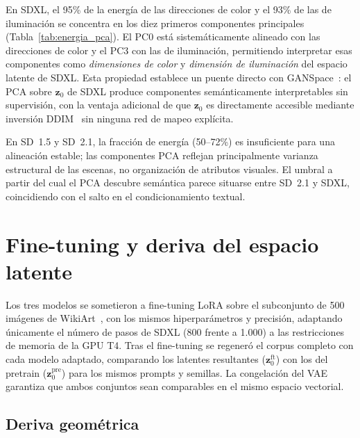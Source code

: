 \documentclass[12pt, a4paper, twoside]{book}
\newcommand{\z}{\mathbf{z}}
\begin{document}
En SDXL, el 95\% de la energía de las direcciones de color y el 93\% de las de iluminación
se concentra en los diez primeros componentes principales (Tabla~\ref{tab:energia_pca}).
El PC0 está sistemáticamente alineado con las direcciones de color y el PC3 con las de
iluminación, permitiendo interpretar esas componentes como \textit{dimensiones de color} y
\textit{dimensión de iluminación} del espacio latente de SDXL. Esta propiedad establece
un puente directo con GANSpace~\citep{harkonen2020ganspace}: el PCA sobre $\z_0$ de SDXL
produce componentes semánticamente interpretables sin supervisión, con la ventaja adicional
de que $\z_0$ es directamente accesible mediante inversión DDIM~\citep{song2021ddim} sin
ninguna red de mapeo explícita.

En SD~1.5 y SD~2.1, la fracción de energía (50--72\%) es insuficiente para una alineación
estable; las componentes PCA reflejan principalmente varianza estructural de las escenas,
no organización de atributos visuales. El umbral a partir del cual el PCA descubre semántica
parece situarse entre SD~2.1 y SDXL, coincidiendo con el salto en el condicionamiento textual.

\section{Fine-tuning y deriva del espacio latente}
\label{sec:res:finetune}

Los tres modelos se sometieron a fine-tuning LoRA sobre el subconjunto de 500 imágenes de
WikiArt~\citep{saleh2015wikiart}, con los mismos hiperparámetros y precisión, adaptando
únicamente el número de pasos de SDXL (800 frente a 1.000) a las restricciones de
memoria de la GPU T4.
Tras el fine-tuning se regeneró el corpus completo con cada modelo adaptado,
comparando los latentes resultantes ($\z_0^{\text{ft}}$) con los del pretrain ($\z_0^{\text{pre}}$)
para los mismos prompts y semillas. La congelación del VAE garantiza que ambos conjuntos sean
comparables en el mismo espacio vectorial.

\subsection{Deriva geométrica}
\label{subsec:res:deriva_geometrica}
\end{document}
